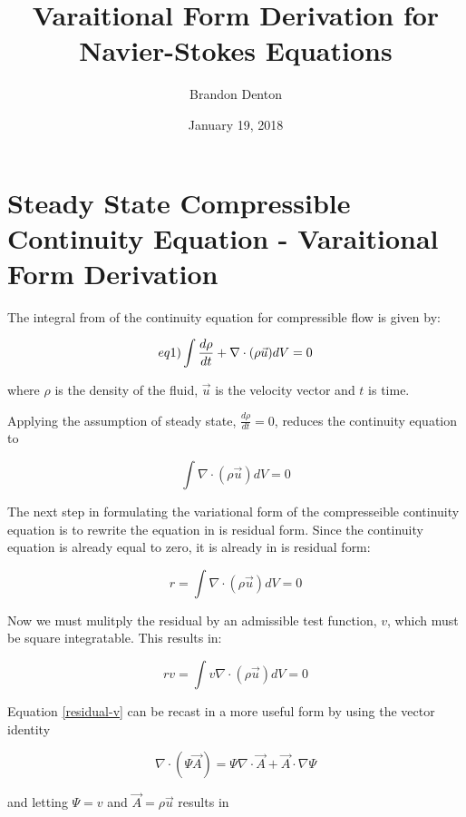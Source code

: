 \documentclass{article}
\begin{document}
\title{Varaitional Form Derivation for Navier-Stokes Equations}
\author{Brandon Denton}
\date{January 19, 2018}

\section{Steady State Compressible Continuity Equation - Varaitional Form Derivation}

The integral from of the continuity equation for compressible flow is given by:

\begin{equation} \label(eq1)
\int \frac{d\rho}{dt}  + \nabla \cdot (\rho \vec{u} ) dV = 0
\end{equation}

where $\rho$ is the density of the fluid, $\vec{u}$ is the velocity vector and $t$ is time.

Applying the assumption of steady state, $\frac{d\rho}{dt} = 0$, reduces the continuity equation to

\begin{equation} \label{eq2}
\int \nabla \cdot (\rho \vec{u} ) dV = 0
\end{equation}

The next step in formulating the variational form of the compresseible continuity equation is to 
rewrite the equation in is residual form. Since the continuity equation is already equal to zero,
it is already in is residual form:

\begin{equation} \label{residual}
r = \int \nabla \cdot (\rho \vec{u} ) dV = 0
\end{equation}

Now we must mulitply the residual by an admissible test function, $v$, which must be square integratable.
This results in:

\begin{equation} \label{residual-v}
rv = \int v \nabla \cdot (\rho \vec{u} ) dV = 0
\end{equation}

Equation \ref{residual-v} can be recast in a more useful form by using the vector identity

\begin{equation} \label{vecIdent}
\nabla \cdot (\Psi \vec{A}) = \Psi \nabla \cdot \vec{A} + \vec{A} \cdot \nabla\Psi
\end{equation}

and letting $\Psi = v$ and $\vec{A} = \rho \vec{u}$ results in
\end{document}
